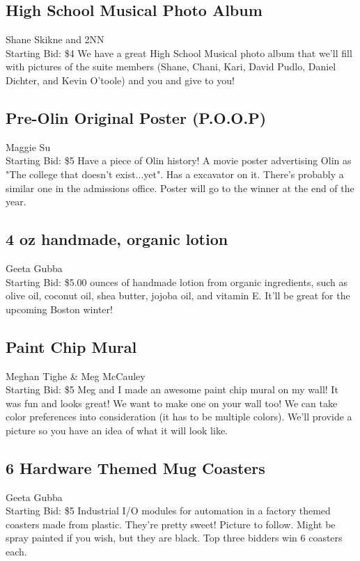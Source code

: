 \documentclass[11pt]{article}
\begin{document}
\subsection{High School Musical Photo Album}
Shane Skikne and 2NN
\\
Starting Bid: \$4
\newline
We have a great High School Musical photo album that we'll fill with pictures of the suite members (Shane, Chani, Kari, David Pudlo, Daniel Dichter, and Kevin O'toole) and you and give to you!
\subsection{Pre-Olin Original Poster (P.O.O.P)}
Maggie Su
\\
Starting Bid: \$5
\newline
Have a piece of Olin history! A movie poster advertising Olin as "The college that doesn't exist...yet". Has a excavator on it. There's probably a similar one in the admissions office. Poster will go to the winner at the end of the year.
\subsection{4 oz handmade, organic lotion}
Geeta Gubba
\\
Starting Bid: \$5.00
 ounces of handmade lotion from organic ingredients, such as olive oil, coconut oil, shea butter, jojoba oil, and vitamin E. It'll be great for the upcoming Boston winter!
\subsection{Paint Chip Mural}
Meghan Tighe \& Meg McCauley
\\
Starting Bid: \$5
\newline
Meg and I made an awesome paint chip mural on my wall! It was fun and looks great! We want to make one on your wall too! We can take color preferences into consideration (it has to be multiple colors).
We'll provide a picture so you have an idea of what it will look like.
\subsection{6 Hardware Themed Mug Coasters}
Geeta Gubba
\\
Starting Bid: \$5
\newline
Industrial I/O modules for automation in a factory themed coasters made from plastic. They're pretty sweet! Picture to follow.
Might be spray painted if you wish, but they are black. Top three bidders win 6 coasters each.
\end{document}
